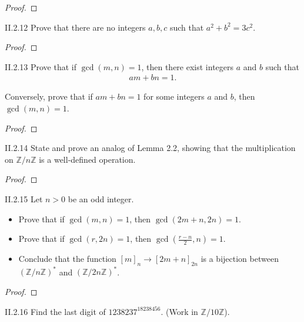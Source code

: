 \begin{proof}
\end{proof}

\begin{exercise}{II.2.12}
    Prove that there are no integers $a, b, c$ such that $a^{2} + b^{2} = 3c^{2}$.
\end{exercise}

\begin{proof}
\end{proof}

\begin{exercise}{II.2.13}
    Prove that if $\gcd(m, n) = 1$, then there exist integers $a$ and $b$ such that
    \begin{align*}
        am + bn = 1.
    \end{align*}

    Conversely, prove that if $am + bn = 1$ for some integers $a$ and $b$, then $\gcd(m, n) = 1$.
\end{exercise}

\begin{proof}
\end{proof}

\begin{exercise}{II.2.14}
    State and prove an analog of Lemma 2.2, showing that the multiplication on $\mathbb{Z}/n\mathbb{Z}$ is a well-defined operation.
\end{exercise}

\begin{proof}
\end{proof}

\begin{exercise}{II.2.15}
    Let $n > 0$ be an odd integer.
    \begin{itemize}
        \item Prove that if $\gcd(m, n) = 1$, then $\gcd(2m + n, 2n) = 1$.
        \item Prove that if $\gcd(r, 2n) = 1$, then $\gcd\left(\frac{r - n}{2}, n\right) = 1$.
        \item Conclude that the function ${[m]}_{n}\to {[2m+n]}_{2n}$ is a bijection between ${(\mathbb{Z}/n\mathbb{Z})}^{*}$ and ${(\mathbb{Z}/2n\mathbb{Z})}^{*}$.
    \end{itemize}
\end{exercise}

\begin{proof}
\end{proof}

\begin{exercise}{II.2.16}
    Find the last digit of $1238237^{18238456}$. (Work in $\mathbb{Z}/10\mathbb{Z}$).
\end{exercise}

